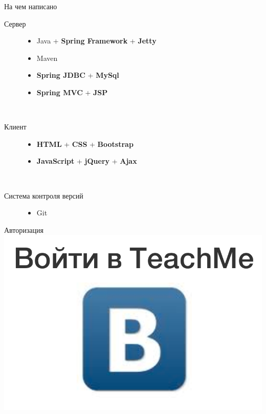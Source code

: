 \documentclass[fullscreen, unicode, bookmarks = false]{beamer}
\begin{document}
    \begin{frame}{На чем написано}
        \begin{description}
            \item [Сервер]
                \begin{itemize}
                    \item Java + {\bf Spring Framework} + {\bf Jetty}
                    \item Maven
                    \item {\bf Spring JDBC} + {\bf MySql}
                    \item {\bf Spring MVC} + {\bf JSP}
                \end{itemize}
            ~\\
            \item [Клиент]
                \begin{itemize}
                    \item {\bf HTML} + {\bf CSS} + {\bf Bootstrap}
                    \item {\bf JavaScript} + {\bf jQuery} + {\bf Ajax} 
                \end{itemize}
            ~\\
            \item [Система контроля версий]
                \begin{itemize}
                    \item Git
                \end{itemize}
        \end{description}
    \end{frame}
    
    \begin{frame}{Авторизация}
		~~~~~~~~~~~~~~~~~\includegraphics[scale=0.22]{login.png}
	\end{frame}
    
\end{document}
